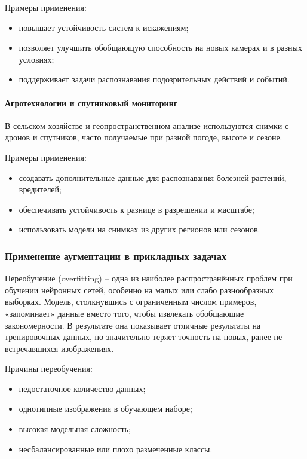 Примеры применения:

\begin{itemize}
	\item повышает устойчивость систем к искажениям;
	\item позволяет улучшить обобщающую способность на новых камерах и в разных условиях;
	\item поддерживает задачи распознавания подозрительных действий и событий.
\end{itemize}

\paragraph{Агротехнологии и спутниковый мониторинг}

В сельском хозяйстве и геопространственном анализе используются снимки с дронов и спутников, часто получаемые при разной погоде, высоте и сезоне.


Примеры применения:

\begin{itemize}
	\item создавать дополнительные данные для распознавания болезней растений, вредителей;
	\item обеспечивать устойчивость к разнице в разрешении и масштабе;
	\item использовать модели на снимках из других регионов или сезонов.
\end{itemize}

\subsubsection{Применение аугментации в прикладных задачах}

Переобучение (overfitting) – одна из наиболее распространённых проблем при обучении нейронных сетей, особенно на малых или слабо разнообразных выборках. Модель, столкнувшись с ограниченным числом примеров, «запоминает» данные вместо того, чтобы извлекать обобщающие закономерности. В результате она показывает отличные результаты на тренировочных данных, но значительно теряет точность на новых, ранее не встречавшихся изображениях.

Причины переобучения:

\begin{itemize}
	\item недостаточное количество данных;
	\item однотипные изображения в обучающем наборе;
	\item высокая модельная сложность;
	\item несбалансированные или плохо размеченные классы.
\end{itemize}

